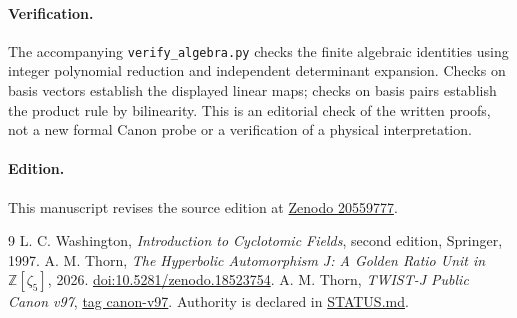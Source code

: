 \documentclass[11pt,a4paper]{article}
\newcommand{\Z}{\mathbb Z}
\begin{document}
\paragraph{Verification.}
The accompanying \texttt{verify\_algebra.py} checks the finite algebraic
identities using integer polynomial reduction and independent determinant
expansion. Checks on basis vectors establish the displayed linear maps;
checks on basis pairs establish the product rule by bilinearity. This is
an editorial check of the written proofs, not a new formal Canon probe
or a verification of a physical interpretation.

\paragraph{Edition.}
This manuscript revises the source edition at \href{https://doi.org/10.5281/zenodo.20559777}{Zenodo 20559777}.

\begin{thebibliography}{9}
 L. C. Washington, \emph{Introduction to Cyclotomic
Fields}, second edition, Springer, 1997.
 A. M. Thorn, \emph{The Hyperbolic Automorphism J:
A Golden Ratio Unit in $\Z[\zeta_5]$}, 2026.
\href{https://doi.org/10.5281/zenodo.18523754}{doi:10.5281/zenodo.18523754}.
 A. M. Thorn, \emph{TWIST-J Public Canon v97},
\href{https://github.com/mathorn1973/twist-j/tree/canon-v97}{tag canon-v97}.
Authority is declared in
\href{https://github.com/mathorn1973/twist-j/blob/canon-v97/STATUS.md}{STATUS.md}.
\end{thebibliography}
\end{document}

